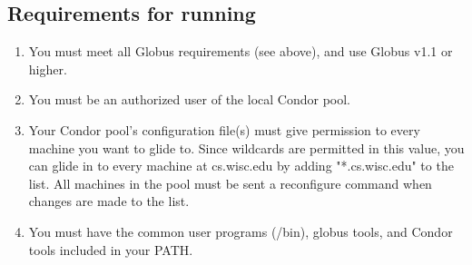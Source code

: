 \subsection{Requirements for running }
\begin{enumerate}
\item You must meet all Globus requirements (see above), and use Globus v1.1 or higher.

\item You must be an authorized user of the local Condor pool.

\item Your Condor pool's configuration file(s) must give 
  permission to every machine you want to glide to. Since wildcards
  are permitted in this value, you can glide in to every machine at
  cs.wisc.edu by adding "*.cs.wisc.edu" to the  list.
  All machines in the pool must be sent a reconfigure command when
  changes are made to the  list.


\item You must have the common user programs (/bin), globus tools, and Condor
  tools included in your PATH.
\end{enumerate}

